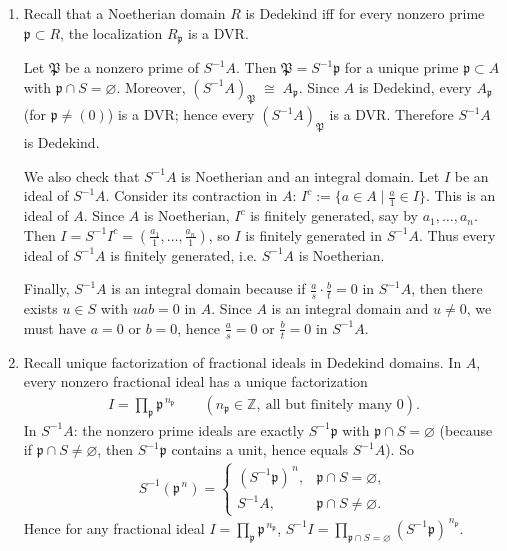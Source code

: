 \documentclass[12pt]{article}  %
\begin{document}
\begin{solution}
    \begin{enumerate}
        \item Recall that a Noetherian domain $R$ is Dedekind iff for every nonzero prime $\mathfrak p\subset R$, the localization $R_{\mathfrak p}$ is a DVR.

Let $\mathfrak P$ be a nonzero prime of $S^{-1}A$. Then $\mathfrak P = S^{-1}\mathfrak p$ for a unique prime $\mathfrak p\subset A$ with $\mathfrak p\cap S=\varnothing$. Moreover,
$(S^{-1}A)_{\mathfrak P}\;\cong\;A_{\mathfrak p}$. Since $A$ is Dedekind, every $A_{\mathfrak p}$ (for $\mathfrak p\neq (0)$) is a DVR; hence every $(S^{-1}A)_{\mathfrak P}$ is a DVR. Therefore $S^{-1}A$ is Dedekind.

We also check that $S^{-1}A$ is Noetherian and an integral domain.  Let $I$ be an ideal of $S^{-1}A$. Consider its contraction in $A$: $I^c := \{a\in A \mid \tfrac{a}{1}\in I\}$. This is an ideal of $A$. Since $A$ is Noetherian, $I^c$ is finitely generated, say by $a_1,\dots,a_n$. Then $I = S^{-1}I^c = \left(\frac{a_1}{1},\dots,\frac{a_n}{1}\right)$, so $I$ is finitely generated in $S^{-1}A$. Thus every ideal of $S^{-1}A$ is finitely generated, i.e. $S^{-1}A$ is Noetherian.

Finally, $S^{-1}A$ is an integral domain because if $\tfrac{a}{s}\cdot \tfrac{b}{t} = 0$ in $S^{-1}A$, then there exists $u\in S$ with $uab = 0$ in $A$. Since $A$ is an integral domain and $u\neq 0$, we must have $a=0$ or $b=0$, hence $\tfrac{a}{s}=0$ or $\tfrac{b}{t}=0$ in $S^{-1}A$.

        \item Recall unique factorization of fractional ideals in Dedekind domains. In $A$, every nonzero fractional ideal has a unique factorization
\begin{align*}
    I=\prod_{\mathfrak p} \mathfrak p^{\,n_{\mathfrak p}}\qquad(n_{\mathfrak p}\in\mathbb Z,\ \text{all but finitely many }0).
\end{align*}	
In $S^{-1}A$: the nonzero prime ideals are exactly $S^{-1}\mathfrak p$ with $\mathfrak p\cap S=\varnothing$ (because if $\mathfrak p\cap S\neq\varnothing$, then $S^{-1}\mathfrak p$ contains a unit, hence equals $S^{-1}A$). So
\begin{align*}
    S^{-1}\!\left(\mathfrak p^{\,n}\right)=
\begin{cases}
(S^{-1}\mathfrak p)^{\,n}, & \mathfrak p\cap S=\varnothing,\\[2pt]
S^{-1}A, & \mathfrak p\cap S\neq\varnothing.
\end{cases}
\end{align*}
Hence for any fractional ideal $I=\prod_{\mathfrak p} \mathfrak p^{\,n_{\mathfrak p}}$,
$S^{-1}I=\prod_{\mathfrak p\cap S=\varnothing}(S^{-1}\mathfrak p)^{\,n_{\mathfrak p}}$.


\end{enumerate}
\end{solution}
\end{document}
